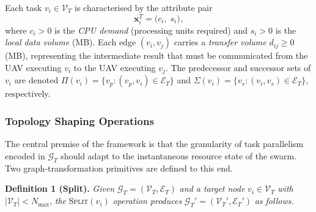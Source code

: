 Each task $v_i \in \mathcal{V}_T$ is characterised by the attribute
pair
\begin{equation}
  \mathbf{x}_i^T = \bigl(c_i,\; s_i\bigr),
  \label{eq:task_attr}
\end{equation}
where $c_i > 0$ is the \emph{CPU demand} (processing units required)
and $s_i > 0$ is the \emph{local data volume} (MB).
Each edge $(v_i, v_j)$ carries a \emph{transfer volume}
$d_{ij} \geq 0$ (MB), representing the intermediate result that must
be communicated from the UAV executing $v_i$ to the UAV executing
$v_j$.
The predecessor and successor sets of $v_i$ are denoted
$\Pi(v_i) = \{v_p : (v_p, v_i) \in \mathcal{E}_T\}$ and
$\Sigma(v_i) = \{v_s : (v_i, v_s) \in \mathcal{E}_T\}$,
respectively.

\subsubsection*{Topology Shaping Operations}

The central premise of the framework is that the granularity of task
parallelism encoded in $\mathcal{G}_T$ should adapt to the
instantaneous resource state of the swarm.
Two graph-transformation primitives are defined to this end.

\smallskip
\noindent\textbf{Definition 1 (Split).}
\emph{Given} $\mathcal{G}_T = (\mathcal{V}_T, \mathcal{E}_T)$
\emph{and a target node} $v_i \in \mathcal{V}_T$
\emph{with} $|\mathcal{V}_T| < N_{\max}$,
\emph{the} \textsc{Split}$(v_i)$
\emph{operation produces}
$\mathcal{G}_T' = (\mathcal{V}_T', \mathcal{E}_T')$
\emph{as follows.}

